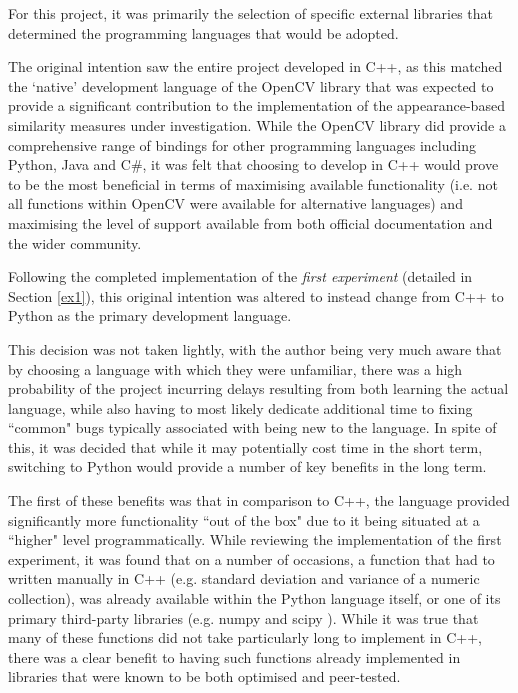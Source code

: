 For this project, it was primarily the selection of specific external libraries that determined the programming languages that would be adopted.

The original intention saw the entire project developed in C++, as this matched the `native' development language of the OpenCV library \cite{opencv} that was expected to provide a significant contribution to the implementation of the appearance-based similarity measures under investigation. While the OpenCV library did provide a comprehensive range of bindings for other programming languages including Python, Java and C\#, it was felt that choosing to develop in C++ would prove to be the most beneficial in terms of maximising available functionality (i.e. not all functions within OpenCV were available for alternative languages) and maximising the level of support available from both official documentation and the wider community. 

Following the completed implementation of the \textit{first experiment} (detailed in Section \ref{ex1}), this original intention was altered to instead change from C++ to Python as the primary development language. 

This decision was not taken lightly, with the author being very much aware that by choosing a language with which they were unfamiliar, there was a high probability of the project incurring delays resulting from both learning the actual language, while also having to most likely dedicate additional time to fixing ``common" bugs typically associated with being new to the language. In spite of this, it was decided that while it may potentially cost time in the short term, switching to Python would provide a number of key benefits in the long term. 

The first of these benefits was that in comparison to C++, the language provided significantly more functionality ``out of the box" due to it being situated at a ``higher" level programmatically. While reviewing the implementation of the first experiment, it was found that on a number of occasions, a function that had to written manually in C++ (e.g. standard deviation and variance of a numeric collection), was already available within the Python language itself, or one of its primary third-party libraries (e.g. numpy \cite{numpy} and scipy \cite{scipy}). While it was true that many of these functions did not take particularly long to implement in C++, there was a clear benefit to having such functions already implemented in libraries that were known to be both optimised and peer-tested. 

